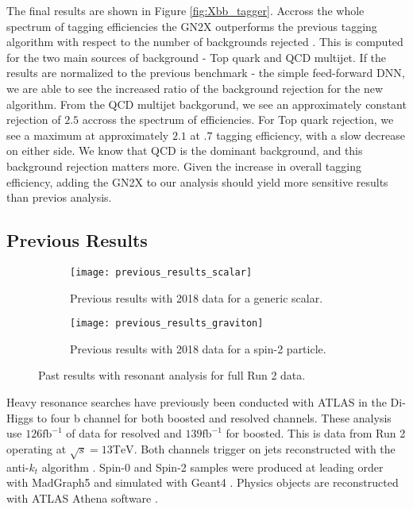 \documentclass[12pt]{article}
\begin{document}
The final results are shown in Figure \ref{fig:Xbb_tagger}. Accross the whole
spectrum of tagging efficiencies the GN2X outperforms the previous tagging
algorithm with respect to the number of backgrounds rejected
\cite{boosted_hbbcc_tagger}. This is computed for the two main sources of
background - Top quark and QCD multijet. If the results are normalized to the
previous benchmark - the simple feed-forward DNN, we are able to see the
increased ratio of the background rejection for the new algorithm. From the QCD
multijet backgorund, we see an approximately constant rejection of $2.5$ accross
the spectrum of efficiencies. For Top quark rejection, we see a maximum at
approximately $2.1$ at $.7$ tagging efficiency, with a slow decrease on either
side. We know that QCD is the dominant background, and this background rejection
matters more. Given the increase in overall tagging efficiency, adding the GN2X
to our analysis should yield more sensitive results than previos analysis.

\subsection{Previous Results}
\begin{figure}[t]
    \centering
    \begin{subfigure}[t]{.48\textwidth}
        \centering
        \texttt{[image: previous\_results\_scalar]}
        \caption{Previous results with 2018 data for a generic scalar.}
        \label{subfig:previous_results_scalar}
    \end{subfigure}
    \hfill
    \begin{subfigure}[t]{.48\textwidth}
        \centering
        \texttt{[image: previous\_results\_graviton]}
        \caption{Previous results with 2018 data for a spin-2 particle.}
        \label{subfig:previous_results_graviton}
    \end{subfigure}
\caption{Past results with resonant analysis for full Run 2 data.}
\label{fig:previous_results}
\end{figure}

Heavy resonance searches have previously been conducted with ATLAS in the Di-Higgs
to four b channel for both boosted and resolved channels. These analysis use
$126 \text{fb}^{-1}$ of data for resolved and $139\text{fb}^{-1}$ for boosted.
This is data from Run 2 operating at $\sqrt{s}=13\text{TeV}$. Both channels
trigger on jets reconstructed with the anti-$k_t$ algorithm \cite{antikt}.
Spin-0 and Spin-2 samples were produced at leading order with MadGraph5
\cite{madgraph5_OG} and simulated with Geant4 \cite{geant4}. Physics objects are
reconstructed with ATLAS Athena software \cite{atlas_simulation}.
\end{document}
